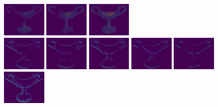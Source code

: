  \includegraphics[width=0.16\textwidth]{ch-psfcn/images/Results/Cast_Shadow/gobletPNG_7_21.jpg}
 \includegraphics[width=0.16\textwidth]{ch-psfcn/images/Results/Cast_Shadow/gobletPNG_9_21.jpg}
 \hfill
 \includegraphics[width=0.16\textwidth]{ch-psfcn/images/Results/Cast_Shadow/gobletPNG_21.jpg} 
 \\
 \includegraphics[width=0.16\textwidth]{ch-psfcn/images/Results/Cast_Shadow/gobletPNG_0_103.jpg}
 \includegraphics[width=0.16\textwidth]{ch-psfcn/images/Results/Cast_Shadow/gobletPNG_3_103.jpg}
 \includegraphics[width=0.16\textwidth]{ch-psfcn/images/Results/Cast_Shadow/gobletPNG_4_103.jpg}
 \includegraphics[width=0.16\textwidth]{ch-psfcn/images/Results/Cast_Shadow/gobletPNG_7_103.jpg}
 \includegraphics[width=0.16\textwidth]{ch-psfcn/images/Results/Cast_Shadow/gobletPNG_9_103.jpg}
 \hfill
 \includegraphics[width=0.16\textwidth]{ch-psfcn/images/Results/Cast_Shadow/gobletPNG_103.jpg} 
 \\
